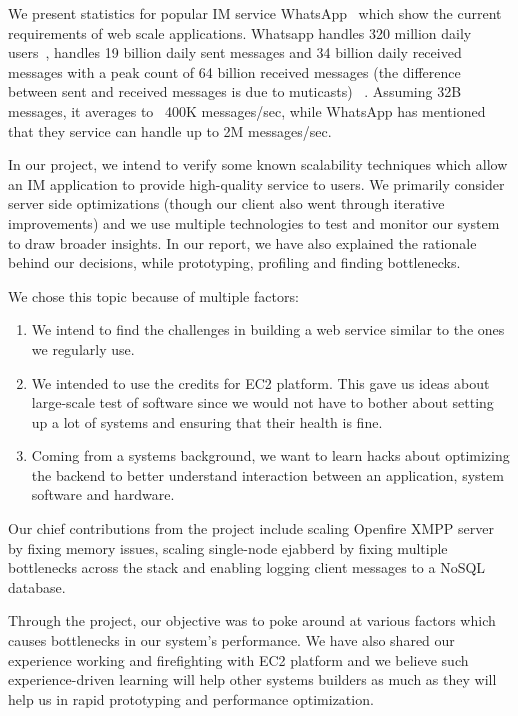 \documentclass[a4paper, twocolumn]{article}
\begin{document}
We present statistics for popular IM service WhatsApp~\cite{w1} which show the current requirements of web scale applications. Whatsapp handles 320 million daily users~\cite{w2}, handles 19 billion daily sent messages and 34 billion daily received messages with a peak count of 64 billion received messages (the difference between sent and received messages is due to muticasts)~\cite{w3} . Assuming 32B messages, it averages to ~400K messages/sec, while WhatsApp has mentioned that they service can handle up to 2M messages/sec. 

In our project, we intend to verify some known scalability techniques which allow an IM application to provide high-quality service to users. We primarily consider server side optimizations (though our client also went through iterative improvements) and we use multiple technologies to test and monitor our system to draw broader insights. In our report, we have also explained the rationale behind our decisions, while prototyping, profiling and finding bottlenecks.

We chose this topic because of multiple factors: 
\begin{enumerate}
\item We intend to find the challenges in building a web service similar to the ones we regularly use. 
\item We intended to use the credits for EC2 platform. This gave us ideas about large-scale test of software since we would not have to bother about setting up a lot of systems and ensuring that their health is fine. 
\item Coming from a systems background, we want to learn hacks about optimizing the backend to better understand interaction between an application, system software and hardware. 
\end{enumerate}

\noindent Our chief contributions from the project include scaling Openfire XMPP server by fixing memory issues, scaling single-node ejabberd by fixing multiple bottlenecks across the stack and enabling logging client messages to a NoSQL database. 

Through the project, our objective was to poke around at various factors which causes bottlenecks in our system's performance. We have also shared our experience working and firefighting with EC2 platform and we believe such experience-driven learning will help other systems builders as much as they will help us in rapid prototyping and performance optimization. 
\end{document}
